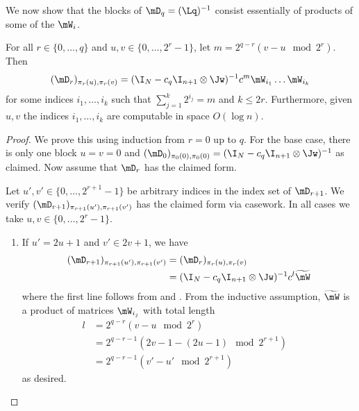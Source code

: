 We now show that the blocks of $\mD_q=(\Lq)^{-1}$ consist essentially of products of
%
some of the $\mW_i$.  %
\begin{lemma}\label{lem:labelstruct}
For all $r \in \{0,\ldots,q\}$ and $u,v\in \{0,\ldots,2^{r}-1\}$, let $m=2^{q-r}(v-u \mod 2^{r})$. Then
$$(\mD_r)_{\pi_{r}(u),\pi_{r}(v)}=(\I_N-c_q\I_{n+1}\otimes\Jw)^{-1}c^{m}\mW_{i_1}\dots \mW_{i_k}$$
for some indices $i_1,\dots,i_k$ such that $\sum_{j=1}^k 2^{i_j}=m$ and $k\leq 2r$. Furthermore, given $u,v$ the indices $i_1,\ldots,i_k$ are computable in space $O(\log n)$.
\end{lemma}
\begin{proof}
We prove this using induction from $r=0$ up to $q$. For the base case, there is only one block $u=v=0$ and $(\mD_{0})_{\pi_0(0),\pi_0(0)}=(\I_N-c_q\I_{n+1}\otimes\Jw)^{-1}$ as claimed.
Now assume that $\mD_{r}$ has the claimed form.

Let $u',v'\in \{0,\ldots,2^{r+1}-1\}$ be arbitrary indices in the index set of $\mD_{r+1}$. We verify $(\mD_{r+1})_{\pi_{r+1}(u'),\pi_{r+1}(v')}$ has the claimed form via casework. In all cases we take $u,v\in \{0,\ldots,2^r-1\}$.

\begin{enumerate}
    \item If $u'=2u+1$ and $v'\in 2v+1$, we have
    \begin{align*}
        (\mD_{r+1})_{\pi_{r+1}(u'),\pi_{r+1}(v')} &= (\mD_{r})_{\pi_r(u),\pi_r(v)}\\
        &= (\I_N-c_q\I_{n+1}\otimes\Jw)^{-1}c^{l}\widetilde{\mW}
    \end{align*}
    where the first line follows from  and . From the inductive assumption, $\widetilde{\mW}$ is a product of matrices $\mW_{i_j}$ with total length
    \begin{align*}
        l &=2^{q-r}(v-u \mod 2^{r})&\\
        &=2^{q-r-1}(2v-1-(2u-1) \mod 2^{r+1})\\
        &=2^{q-r-1}(v'-u' \mod 2^{r+1})
    \end{align*} 
    as desired.
    

\end{enumerate}
\end{proof}
